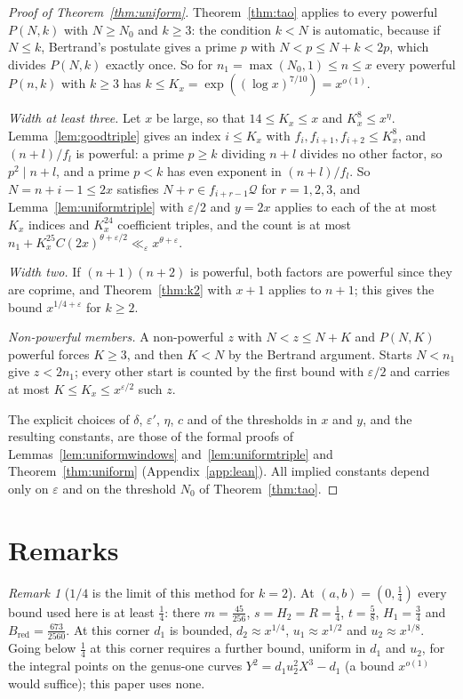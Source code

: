 \documentclass[11pt,reqno]{amsart}
\theoremstyle{definition}
\theoremstyle{remark}
\newtheorem{remark}[theorem]{Remark}
\numberwithin{equation}{section}
\newcommand{\Bred}{B_{\mathrm{red}}}
\begin{document}
\begin{proof}[Proof of Theorem~\ref{thm:uniform}]
Theorem~\ref{thm:tao} applies to every powerful $P(N,k)$ with $N\ge N_0$ and
$k\ge3$: the condition $k<N$ is automatic, because if $N\le k$, Bertrand's
postulate gives a prime $p$ with $N<p\le N+k<2p$, which divides $P(N,k)$
exactly once. So for $n_1=\max(N_0,1)\le n\le x$ every powerful $P(n,k)$ with
$k\ge3$ has $k\le K_x=\exp((\log x)^{7/10})=x^{o(1)}$.

\emph{Width at least three.} Let $x$ be large, so that $14\le K_x\le x$ and
$K_x^8\le x^\eta$. Lemma~\ref{lem:goodtriple} gives an index $i\le K_x$ with
$f_i,f_{i+1},f_{i+2}\le K_x^8$, and $(n+l)/f_l$ is powerful: a prime $p\ge k$
dividing $n+l$ divides no other factor, so $p^2\mid n+l$, and a prime $p<k$
has even exponent in $(n+l)/f_l$. So $N=n+i-1\le2x$ satisfies
$N+r\in f_{i+r-1}\mathcal Q$ for $r=1,2,3$, and Lemma~\ref{lem:uniformtriple} with $\varepsilon/2$ and
$y=2x$ applies to each of the at most $K_x$ indices and $K_x^{24}$ coefficient
triples, and the count is at most
$n_1+K_x^{25}C(2x)^{\theta+\varepsilon/2}\ll_\varepsilon x^{\theta+\varepsilon}$.

\emph{Width two.} If $(n+1)(n+2)$ is powerful, both factors are powerful
since they are coprime, and Theorem~\ref{thm:k2} with $x+1$ applies to $n+1$;
this gives the bound
$x^{1/4+\varepsilon}$ for $k\ge2$.

\emph{Non-powerful members.} A non-powerful $z$ with $N<z\le N+K$ and
$P(N,K)$ powerful forces $K\ge3$, and then $K<N$ by the Bertrand argument.
Starts $N<n_1$ give $z<2n_1$; every other start is counted by the first bound
with $\varepsilon/2$ and carries at most $K\le K_x\le x^{\varepsilon/2}$ such $z$.

The explicit choices of $\delta$, $\varepsilon'$, $\eta$, $c$ and of the
thresholds in $x$ and $y$, and the resulting constants, are those of the
formal proofs of Lemmas~\ref{lem:uniformwindows} and~\ref{lem:uniformtriple}
and Theorem~\ref{thm:uniform} (Appendix~\ref{app:lean}). All implied
constants depend only on $\varepsilon$ and on the threshold $N_0$ of
Theorem~\ref{thm:tao}.
\end{proof}

\section{Remarks}\label{sec:remarks}

\begin{remark}[$1/4$ is the limit of this method for $k=2$]\label{rem:quarter}
At $(a,b)=(0,\frac14)$ every bound used here is at least $\frac14$: there
$m=\frac{45}{256}$, $s=H_2=R=\frac14$, $t=\frac58$, $H_1=\frac34$ and
$\Bred=\frac{673}{2560}$. At this corner $d_1$ is bounded,
$d_2\approx x^{1/4}$, $u_1\approx x^{1/2}$ and $u_2\approx x^{1/8}$. Going
below $\frac14$ at this corner requires a further bound, uniform in $d_1$ and
$u_2$, for the integral points on the genus-one curves $Y^2=d_1u_2^2X^3-d_1$
(a bound $x^{o(1)}$ would suffice); this paper uses none.
\end{remark}
\end{document}

